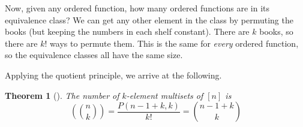 \documentclass[10pt,]{book}
\theoremstyle{plain}
\newtheorem{theorem}{Theorem}[section]
\theoremstyle{definition}
\theoremstyle{definition}
\theoremstyle{definition}
\theoremstyle{definition}
\numberwithin{equation}{chapter}
\newcommand{\mchoose}[2]{\left(\!\binom{#1}{#2}\!\right)}
\begin{document}
\par
\hypertarget{p-757}{}%
Now, given any ordered function, how many ordered functions are in its equivalence class?  We can get any other element in the class by permuting the books (but keeping the numbers in each shelf constant).  There are \(k\) books, so there are \(k!\) ways to permute them.  This is the same for \emph{every} ordered function, so the equivalence classes all have the same size.%
\par
\hypertarget{p-758}{}%
Applying the quotient principle, we arrive at the following.%
\begin{theorem}[{}]\label{thm-multisetsize}
\hypertarget{p-759}{}%
The number of \(k\)-element multisets of \([n]\) is%
\begin{equation*}
\mchoose{n}{k} = \frac{P(n-1+k, k)}{k!} = \binom{n-1+k}{k} 
\end{equation*}
%
\end{theorem}
\typeout{************************************************}
\typeout{************************************************}
\end{document}
